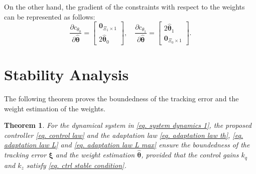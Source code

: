 \documentclass[letterpaper, 10 pt, conference]{ieeeconf}  %
\newtheorem{theorem}{Theorem}
\newcommand*{\mv}[1]{\boldsymbol{#1}}
\newcommand*{\mm}[1]{\boldsymbol{#1}}
\begin{document}
On the other hand, the gradient of the constraints with respect to the weights can be represented as follows:
\begin{equation}
    \frac{\partial c_{\theta_0}}{\partial{\hat{\mv\theta}}}
    = 
    \begin{bmatrix}
        \mm 0_{\Xi_1\times 1} \\
        2{\hat{\mv\theta}}_0 
    \end{bmatrix}
    ,\quad
    \frac{\partial c_{\theta_1}}{\partial{\hat{\mv\theta}}}    
    = 
    \begin{bmatrix}
        2{\hat{\mv\theta}}_1 \\
        \mm 0_{\Xi_0\times 1}
    \end{bmatrix}
    .
\end{equation}

\section{Stability Analysis}\label{sec:stability}

The following theorem proves the boundedness of the tracking error and the weight estimation of the weights.

\begin{theorem}
For the dynamical system in \eqref{eq. system dynamics 1}, the proposed controller \eqref{eq. control law} and the adaptation law \eqref{eq. adaptation law th}, \eqref{eq. adaptation law L} and \eqref{eq. adaptation law L max} ensure the boundedness of the tracking error $\mv \xi$ and the weight estimation ${\hat{\mv\theta}}$, provided that the control gains ${k_q}$ and ${k_z}$ satisfy \eqref{eq. ctrl stable condition}.
\end{theorem}
\end{document}
